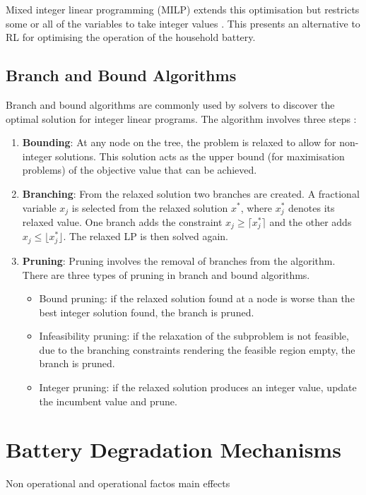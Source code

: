 Mixed integer linear programming (MILP) extends this optimisation but restricts some or all of the variables to take integer values \cite{NemhauserWolsey1988}. This presents an alternative to RL for optimising the operation of the household battery. 

\subsection{Branch and Bound Algorithms}
Branch and bound algorithms are commonly used by solvers to discover the optimal solution for integer linear programs. The algorithm involves three steps \cite{LandDoig1960}:

\begin{enumerate}
  \item \textbf{Bounding}: At any node on the tree, the problem is relaxed to allow for non-integer solutions. This solution acts as the upper bound (for maximisation problems) of the objective value that can be achieved.
  
  \item \textbf{Branching}: From the relaxed solution two branches are created. A fractional variable $x_j$ is selected from the relaxed solution 
$x^*$, where $x_j^*$ denotes its relaxed value. One branch adds the constraint $x_j \geq \lceil x_j^* \rceil$ 
and the other adds $x_j \leq \lfloor x_j^* \rfloor$. The relaxed LP is then solved again.
 
  
  \item \textbf{Pruning}: Pruning involves the removal of branches from the algorithm. There are three types of pruning in branch and bound algorithms. 
  \begin{itemize}
  \item[--] Bound pruning: if the relaxed solution found at a node is worse than the best integer solution found, the branch is pruned.
  \item[--] Infeasibility pruning: if the relaxation of the subproblem is not feasible, due to the branching constraints rendering the feasible region empty, the branch is pruned.
  \item[--] Integer pruning: if the relaxed solution produces an integer value, update the incumbent value and prune.
\end{itemize}
\end{enumerate}



\section{Battery Degradation Mechanisms}
Non operational and operational factos
main effects


